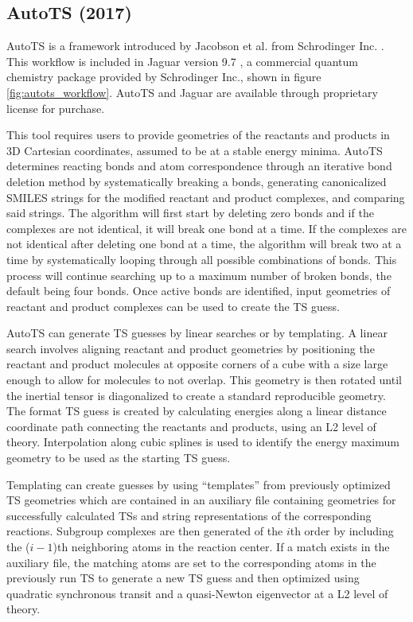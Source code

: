\documentclass[preprint, 11pt]{elsarticle} %
\begin{document}
\subsection{AutoTS (2017)}

AutoTS is a framework introduced by Jacobson et al. from Schrodinger Inc. \cite{jacobson:2017}. 
This workflow is included in Jaguar version 9.7 \cite{Jaguar:2013}, a commercial quantum chemistry package provided by Schrodinger Inc., shown in figure \ref{fig:autots_workflow}.
AutoTS and Jaguar are available through proprietary license for purchase.

This tool requires users to provide geometries of the reactants and products in 3D Cartesian coordinates, assumed to be at a stable energy minima.
AutoTS determines reacting bonds and atom correspondence through an iterative bond deletion method by systematically breaking a bonds, generating canonicalized SMILES strings for the modified reactant and product complexes, and comparing said strings.
The algorithm will first start by deleting zero bonds and if the complexes are not identical, it will break one bond at a time.
If the complexes are not identical after deleting one bond at a time, the algorithm will break two at a time by systematically looping through all possible combinations of bonds.
This process will continue searching up to a maximum number of broken bonds, the default being four bonds.
Once active bonds are identified, input geometries of reactant and product complexes can be used to create the TS guess.

AutoTS can generate TS guesses by linear searches or by templating. 
A linear search involves aligning reactant and product geometries by positioning the reactant and product molecules at opposite corners of a cube with a size large enough to allow for molecules to not overlap.
This geometry is then rotated until the inertial tensor is diagonalized to create a standard reproducible geometry.
The format TS guess is created by calculating energies along a linear distance coordinate path connecting the reactants and products, using an L2 level of theory.
Interpolation along cubic splines is used to identify the energy maximum geometry to be used as the starting TS guess.

Templating can create guesses by using ``templates''  from previously optimized TS geometries which are contained in an auxiliary file containing geometries for successfully calculated TSs and string representations of the corresponding reactions.
Subgroup complexes are then generated of the $i$th order by including the ($i-1$)th neighboring atoms in the reaction center. 
If a match exists in the auxiliary file, the matching atoms are set to the corresponding atoms in the previously run TS to generate a new TS guess and  then optimized using quadratic synchronous transit and a quasi-Newton eigenvector at a L2 level of theory.
\end{document}

